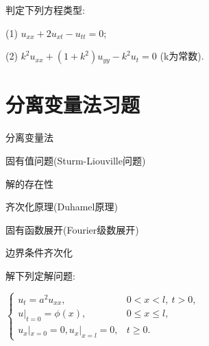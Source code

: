 \documentclass[color=blue,lang=cn,newtx,10pt,scheme=chinese]{elegantbook}
\begin{document}
\begin{solution}
  
\end{solution}
\quad

\begin{exercise}
判定下列方程类型:

(1) $u_{xx}+2u_{xt}-u_{tt}=0$;

(2) $k^2u_{xx}+(1+k^2)u_{yy}-k^2u_t=0$ (k为常数).
\end{exercise}
\quad

\begin{solution}
  
\end{solution}
\quad




\chapter{分离变量法习题}%

\begin{introduction}
  \item 分离变量法
  \item 固有值问题(Sturm-Liouville问题)
  \item 解的存在性
  \item 齐次化原理(Duhamel原理)
  \item 固有函数展开(Fourier级数展开)
  \item 边界条件齐次化
\end{introduction}
\quad

\begin{exercise}
  解下列定解问题:

  $\begin{cases}
    u_t=a^2u_{xx}, & 0<x<l,\ t>0,\\
    u|_{t=0} =\phi (x), & 0\leq x\leq l,\\
    u_x|_{x=0}=0,u_x|_{x=l}=0, & t\geq 0.
  \end{cases}$
\end{exercise}
\quad

\begin{solution}

\end{solution}
\quad
\end{document}
